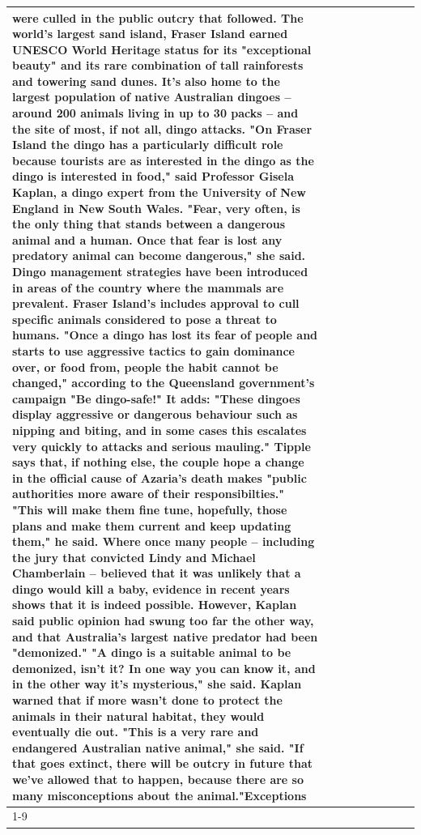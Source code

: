 \begin{table}[H]
\begin{tabular}{lllrlllll}
were culled in the public outcry that followed. The world's largest sand island, Fraser Island earned UNESCO World Heritage status for its "exceptional beauty" and its rare combination of tall rainforests and towering sand dunes. It's also home to the largest population of native Australian dingoes -- around 200 animals living in up to 30 packs -- and the site of most, if not all, dingo attacks. "On Fraser Island the dingo has a particularly difficult role because tourists are as interested in the dingo as the dingo is interested in food," said Professor Gisela Kaplan, a dingo expert from the University of New England in New South Wales. "Fear, very often, is the only thing that stands between a dangerous animal and a human. Once that fear is lost any predatory animal can become dangerous," she said. Dingo management strategies have been introduced in areas of the country where the mammals are prevalent. Fraser Island's includes approval to cull specific animals considered to pose a threat to humans. "Once a dingo has lost its fear of people and starts to use aggressive tactics to gain dominance over, or food from, people the habit cannot be changed," according to the Queensland government's campaign "Be dingo-safe!" It adds: "These dingoes display aggressive or dangerous behaviour such as nipping and biting, and in some cases this escalates very quickly to attacks and serious mauling." Tipple says that, if nothing else, the couple hope a change in the official cause of Azaria's death makes "public authorities more aware of their responsibilties." "This will make them fine tune, hopefully, those plans and make them current and keep updating them," he said. Where once many people -- including the jury that convicted Lindy and Michael Chamberlain -- believed that it was unlikely that a dingo would kill a baby, evidence in recent years shows that it is indeed possible. However, Kaplan said public opinion had swung too far the other way, and that Australia's largest native predator had been "demonized." "A dingo is a suitable animal to be demonized, isn't it? In one way you can know it, and in the other way it's mysterious," she said. Kaplan warned that if more wasn't done to protect the animals in their natural habitat, they would eventually die out. "This is a very rare and endangered Australian native animal," she said. "If that goes extinct, there will be outcry in future that we've allowed that to happen, because there are so many misconceptions about the animal."Exceptions \\
\cline{1-9}

\end{tabular}
\end{table}
